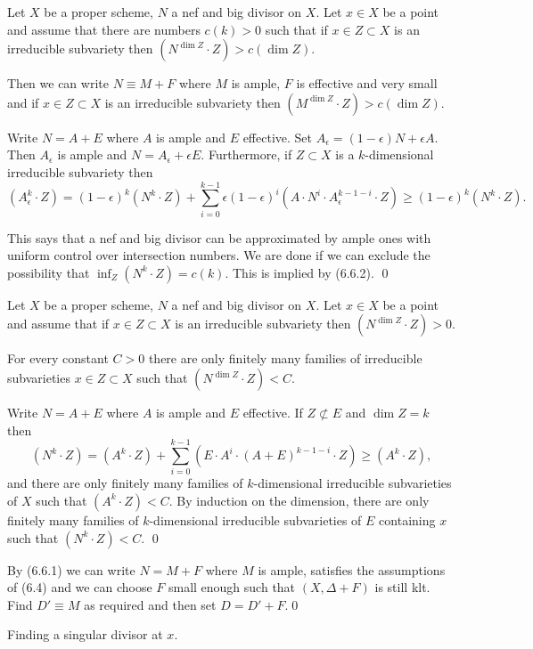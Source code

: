  Let $X$ be a proper scheme, $N$ a nef  and big divisor
on
$X$. Let
$x\in X$ be a point and assume that there are numbers $c(k)>0$ such that if
$x\in Z\subset X$  is an irreducible subvariety then $(N^{\dim Z}\cdot
Z)>c(\dim Z)$. 

Then we can write $N\equiv M+F$ where $M$ is ample, $F$ is effective and very
small and if
$x\in Z\subset X$  is an irreducible subvariety then $(M^{\dim Z}\cdot
Z)>c(\dim Z)$. 
\endproclaim

\demop  Write $N=A+E$ where $A$ is ample and $E$ effective.
Set 
$A_{\epsilon}=(1-{\epsilon})N+{\epsilon}A$. Then  $A_{\epsilon}$ is  ample
and $N=A_{\epsilon}+\epsilon E$. 
Furthermore, if $Z\subset X$ is a $k$-dimensional irreducible subvariety then
$$
(A_{\epsilon}^k\cdot Z)=(1-{\epsilon})^k(N^k\cdot Z)+\sum_{i=0}^{k-1}
\epsilon(1-{\epsilon})^i(A\cdot
N^i\cdot A_{\epsilon}^{k-1-i}\cdot Z) \geq (1-{\epsilon})^k(N^k\cdot Z).
$$

This says that a nef and big  divisor can be approximated by ample
ones with uniform control over intersection numbers.
We are done if we can exclude the possibility that $\inf_Z (N^k\cdot Z)=c(k)$.
This is implied by (6.6.2).
\qed\enddemo

  Let $X$ be a proper scheme, $N$ a nef  and big divisor
on
$X$. Let
$x\in X$ be a point and assume that  if
$x\in Z\subset X$  is an irreducible subvariety then $(N^{\dim Z}\cdot Z)>0$. 

For every constant $C>0$ there are only finitely many families of 
irreducible subvarieties $x\in Z\subset X$  such that 
$(N^{\dim Z}\cdot Z)<C$.
\endproclaim

\demop Write $N=A+E$ where $A$ is ample and $E$ effective.
If $Z\not\subset E$ and $\dim Z=k$ then 
$$
(N^k\cdot Z)=(A^k\cdot Z)+\sum_{i=0}^{k-1}(E\cdot A^i\cdot
(A+E)^{k-1-i}\cdot Z) \geq (A^k\cdot Z),
$$
 and there are only  finitely many
families of $k$-dimensional irreducible subvarieties of $X$ such that 
$(A^k\cdot Z)<C$.  By induction on the dimension, there are 
only 
finitely many families of $k$-dimensional
irreducible subvarieties of $E$ containing $x$ such that 
$(N^k\cdot Z)<C$.
\qed\enddemo

By (6.6.1) we
can write
$N=M+F$ where $M$ is ample, satisfies the assumptions of (6.4) and we
can choose $F$  small enough such that $(X,\Delta+F)$ is still klt. Find
$D'\equiv M$ as required and then set $D=D'+F$.\qed\enddemo


 Finding a singular divisor at  $x$. 




